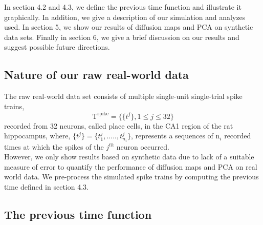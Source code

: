 In section  4.2 and 4.3,  we define the previous time function and illustrate it graphically.  In addition, we give a description of our simulation and analyzes used. In section 5, we show our results of diffusion maps and PCA on synthetic data sets.
Finally in section 6, we give a brief discussion on our results and suggest possible future directions.


\subsection{Nature of our raw real-world data}
The  raw real-world data set consists  of multiple single-unit single-trial spike trains,\\
\[ 
\text{T}^{\text{spike}} = \displaystyle \{ \{ t^{j} \} ,  1 \leq j \leq 32 \}  
\]
recorded from 32 neurons, called  place cells, in the CA1 region of the rat hippocampus, where,
$\displaystyle  \{t^{j}\} =  \{t_{1}^{j}, ....., t_{n_{i}}^{j} \} $, represents  a sequences of n$_{i}$ recorded times at which the spikes of the $j^{th}$ neuron occurred. \\
However, we only show results based on synthetic data due to lack of a suitable measure of error to quantify 
the performance of  diffusion maps and PCA on real world data.  We pre-process the simulated spike trains by computing  the previous time  defined in section 4.3.
 


\subsection{The previous time function}

